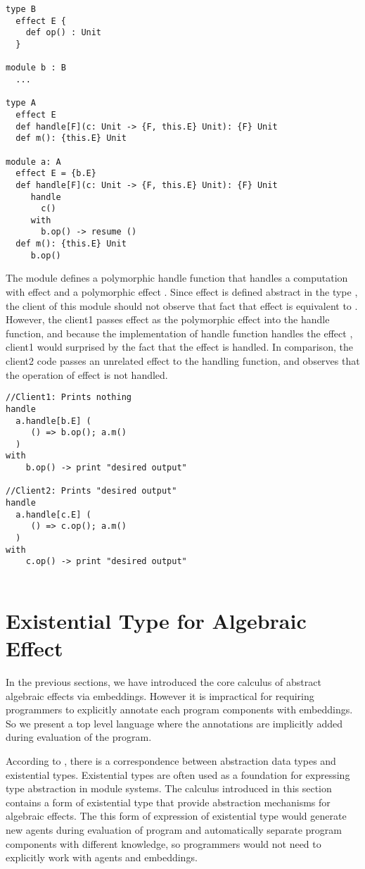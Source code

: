 \begin{lstlisting}
type B
  effect E {
  	def op() : Unit
  }

module b : B
  ...

type A
  effect E 
  def handle[F](c: Unit -> {F, this.E} Unit): {F} Unit
  def m(): {this.E} Unit
  
module a: A
  effect E = {b.E}
  def handle[F](c: Unit -> {F, this.E} Unit): {F} Unit
     handle
       c()
     with
       b.op() -> resume ()
  def m(): {this.E} Unit
     b.op()
  \end{lstlisting}

The module  defines a polymorphic handle function that handles a computation with effect  and a polymorphic effect . Since effect  is defined abstract in the type , the client of this module should not observe that fact that effect  is equivalent to . However, the client1 passes effect  as the polymorphic effect into the handle function, and because the implementation of  handle function handles the effect , client1 would surprised by the fact that the effect  is handled. In comparison, the client2 code passes an unrelated effect  to the handling function, and observes that the operation of effect  is not handled.

\begin{lstlisting}
//Client1: Prints nothing
handle 
  a.handle[b.E] (
     () => b.op(); a.m()
  )
with
    b.op() -> print "desired output"

//Client2: Prints "desired output"
handle 
  a.handle[c.E] (
     () => c.op(); a.m()
  )
with
    c.op() -> print "desired output"
    
\end{lstlisting}


\section{Existential Type for Algebraic Effect}
\label{sec-exist}
In the previous sections, we have introduced the core calculus of abstract algebraic effects via embeddings. However it is  impractical for requiring programmers to explicitly annotate each program components with embeddings. So we present a top level language where the annotations are implicitly added during evaluation of the program.  

According to \citet{mitchell88}, there is a correspondence between abstraction data types and existential types. Existential types are often used as a foundation for expressing type abstraction in module systems. The  calculus introduced in this section contains a form of existential type that provide abstraction mechanisms for algebraic effects. The this form of expression of existential type would generate new agents during evaluation of program and automatically separate program components with different knowledge, so programmers would not need to explicitly work with agents and embeddings.

